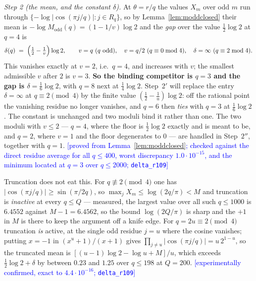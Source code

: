 \documentclass[11pt,a4paper]{article}
\theoremstyle{plain}
\theoremstyle{definition}
\theoremstyle{remark}
\newcommand{\STATUS}[1]{\textcolor{blue}{\textsf{[#1]}}}
\begin{document}
\emph{Step 2 (the mean, and the constant $\delta$).} At $\theta=r/q$ the values $X_m$ over odd
$m$ run through $\{-\log|\cos(\pi j/q)|:j\in R_q\}$, so by Lemma~\ref{lem:moddclosed} their
mean is $-\log M_{\mathrm{odd}}(q)=(1-1/v)\log2$ and the \emph{gap} over the value $\tfrac12\log2$
at $q=4$ is
\[
   \delta(q)\;=\;\Bigl(\tfrac12-\tfrac1v\Bigr)\log 2 ,\qquad
   v=q\ (q\text{ odd}),\quad v=q/2\ (q\equiv0\bmod4),\quad \delta=\infty\ (q\equiv2\bmod4).
\]
This vanishes exactly at $v=2$, i.e.\ $q=4$, and increases with $v$; the smallest admissible
$v$ after $2$ is $v=3$. \textbf{So the binding competitor is $q=3$ and the gap is
$\delta=\tfrac16\log2$}, with $q=8$ next at $\tfrac14\log2$. Step~2$'$ will replace the entry
$\delta=\infty$ at $q\equiv2\pmod4$ by the finite value $(\tfrac12-\tfrac1u)\log2$: off the
rational point the vanishing residue no longer vanishes, and $q=6$ then \emph{ties} with $q=3$
at $\tfrac16\log2$. The constant is unchanged and two moduli bind it rather than one. The two
moduli with $v\le2$ --- $q=4$, where the floor is $\tfrac12\log2$ exactly and is meant to be, and
$q=2$, where $v=1$ and the floor degenerates to $0$ --- are handled in Step~$2''$, together with
$q=1$.
\STATUS{proved from Lemma~\ref{lem:moddclosed}; checked against the direct residue average for
all $q\le400$, worst discrepancy $1.0\cdot10^{-15}$, and the minimum located at $q=3$ over
$q\le2000$; \texttt{delta\_r109}}

Truncation does not eat this. For $q\not\equiv2\pmod4$ one has $|\cos(\pi j/q)|\ge\sin(\pi/2q)$,
so $\max_jX_m\le\log(2q/\pi)<M$ and truncation is \emph{inactive} at every $q\le Q$
--- measured, the largest value over all such $q\le1000$ is $6.4552$ against
$M-1=6.4562$, so the bound $\log(2Q/\pi)$ is sharp and the $+1$ in $M$ is there to keep the
argument off a knife edge. For $q=2u\equiv2\pmod4$ truncation \emph{is} active, at the single
odd residue $j=u$ where the cosine vanishes; putting $x=-1$ in $(x^u+1)/(x+1)$ gives
$\prod_{j\ne u}|\cos(\pi j/q)|=u\,2^{1-u}$, so the truncated mean is
$[(u-1)\log2-\log u+M]/u$, which exceeds $\tfrac12\log2+\delta$ by between $0.23$ and $1.25$
over $q\le198$ at $Q=200$.
\STATUS{experimentally confirmed, exact to $4.4\cdot10^{-16}$; \texttt{delta\_r109}}
\end{document}
